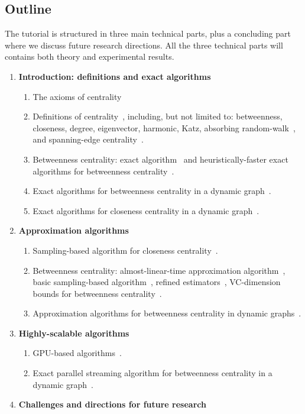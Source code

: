 \documentclass[11pt]{article}
\begin{document}
\clearpage

\subsection*{Outline}
The tutorial is structured in three main technical parts, plus a concluding part
where we discuss future research directions. All the three technical parts will
contains both theory and experimental results.

\begin{enumerate}
	\item {\bf Introduction: definitions and exact algorithms}
		\begin{enumerate}
			\item The axioms of centrality~\citep{BoldiV14}
			\item Definitions of centrality~\citep{Newman10}, including, but not
				limited to: betweenness, closeness, degree, eigenvector,
				harmonic, Katz, absorbing random-walk~\citep{MavroforakisMG15},
				and spanning-edge centrality~\citep{MavroforakisGLKT15}.
			\item Betweenness centrality: exact algorithm~\citep{Brandes01} and
				heuristically-faster exact algorithms for betweenness
				centrality~\citep{ErdosIBT15,SaryuceSKC13}.
			\item Exact algorithms for betweenness centrality in a dynamic
				graph~\citep{LeeLPCC12,NasrePR14,PontecorviR15}.
			\item Exact algorithms for closeness centrality in a dynamic
				graph~\citep{SariyuceKSC13b}.
		\end{enumerate}
	\item {\bf Approximation algorithms}
		\begin{enumerate}
			\item Sampling-based algorithm for closeness
				centrality~\citep{EppsteinW04}.
			\item Betweenness centrality: almost-linear-time approximation
				algorithm~\citep{Yoshida14}, basic sampling-based
				algorithm~\citep{BrandesP07}, refined
				estimators~\citep{GeisbergerSS08}, VC-dimension bounds for
				betweenness centrality~\citep{RiondatoK15}.
			\item Approximation algorithms for betweenness centrality in dynamic
				graphs~\citep{KasWCC13,BergaminiMS14,BergaminiM15}.
		\end{enumerate}
	\item {\bf Highly-scalable algorithms}
		\begin{enumerate}
			\item GPU-based algorithms~\citep{SariyuceKSC13}.
			\item Exact parallel streaming algorithm for betweenness centrality in a
				dynamic graph~\citep{KourtellisMB15}.
		\end{enumerate}
	\item {\bf Challenges and directions for future research}
\end{enumerate}
\end{document}
